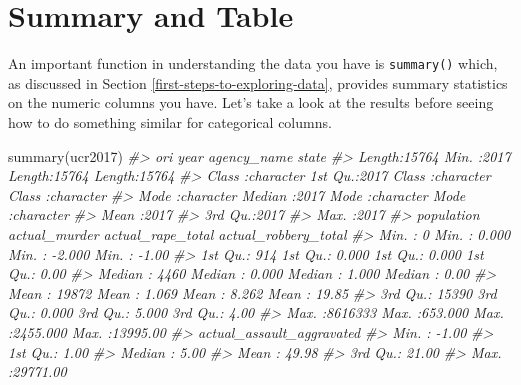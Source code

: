 \documentclass[
]{krantz}
\makeatletter
\newenvironment{Shaded}{\begin{snugshade}}{\end{snugshade}}
\newcommand{\CommentTok}[1]{\textcolor[rgb]{0.37,0.37,0.37}{\textit{#1}}}
\newcommand{\FunctionTok}[1]{\textcolor[rgb]{0,0,0}{#1}}
\newcommand{\NormalTok}[1]{#1}
\newenvironment{kframe}{%
\medskip{}
\setlength{\fboxsep}{.8em}
 \def\at@end@of@kframe{}%
 \ifinner\ifhmode%
  \def\at@end@of@kframe{\end{minipage}}%
  \begin{minipage}{\columnwidth}%
 \fi\fi%
 \def\FrameCommand##1{\hskip\@totalleftmargin \hskip-\fboxsep
 \colorbox{shadecolor}{##1}\hskip-\fboxsep
     \hskip-\linewidth \hskip-\@totalleftmargin \hskip\columnwidth}%
 \MakeFramed {\advance\hsize-\width
   \@totalleftmargin\z@ \linewidth\hsize
   \@setminipage}}%
 {\par\unskip\endMakeFramed%
 \at@end@of@kframe}
\renewenvironment{Shaded}{\begin{kframe}}{\end{kframe}}
\makeatother
\begin{document}
\hypertarget{summary-and-table}{%
\section{Summary and Table}\label{summary-and-table}}

An important function in understanding the data you have is \texttt{summary()} which, as discussed in Section \ref{first-steps-to-exploring-data}, provides summary statistics on the numeric columns you have. Let's take a look at the results before seeing how to do something similar for categorical columns.

\begin{Shaded}
\begin{Highlighting}[]
\FunctionTok{summary}\NormalTok{(ucr2017)}
\CommentTok{\#\textgreater{}      ori                 year      agency\_name           state          }
\CommentTok{\#\textgreater{}  Length:15764       Min.   :2017   Length:15764       Length:15764      }
\CommentTok{\#\textgreater{}  Class :character   1st Qu.:2017   Class :character   Class :character  }
\CommentTok{\#\textgreater{}  Mode  :character   Median :2017   Mode  :character   Mode  :character  }
\CommentTok{\#\textgreater{}                     Mean   :2017                                        }
\CommentTok{\#\textgreater{}                     3rd Qu.:2017                                        }
\CommentTok{\#\textgreater{}                     Max.   :2017                                        }
\CommentTok{\#\textgreater{}    population      actual\_murder     actual\_rape\_total  actual\_robbery\_total}
\CommentTok{\#\textgreater{}  Min.   :      0   Min.   :  0.000   Min.   :  {-}2.000   Min.   :   {-}1.00    }
\CommentTok{\#\textgreater{}  1st Qu.:    914   1st Qu.:  0.000   1st Qu.:   0.000   1st Qu.:    0.00    }
\CommentTok{\#\textgreater{}  Median :   4460   Median :  0.000   Median :   1.000   Median :    0.00    }
\CommentTok{\#\textgreater{}  Mean   :  19872   Mean   :  1.069   Mean   :   8.262   Mean   :   19.85    }
\CommentTok{\#\textgreater{}  3rd Qu.:  15390   3rd Qu.:  0.000   3rd Qu.:   5.000   3rd Qu.:    4.00    }
\CommentTok{\#\textgreater{}  Max.   :8616333   Max.   :653.000   Max.   :2455.000   Max.   :13995.00    }
\CommentTok{\#\textgreater{}  actual\_assault\_aggravated}
\CommentTok{\#\textgreater{}  Min.   :   {-}1.00         }
\CommentTok{\#\textgreater{}  1st Qu.:    1.00         }
\CommentTok{\#\textgreater{}  Median :    5.00         }
\CommentTok{\#\textgreater{}  Mean   :   49.98         }
\CommentTok{\#\textgreater{}  3rd Qu.:   21.00         }
\CommentTok{\#\textgreater{}  Max.   :29771.00}
\end{Highlighting}
\end{Shaded}
\end{document}
